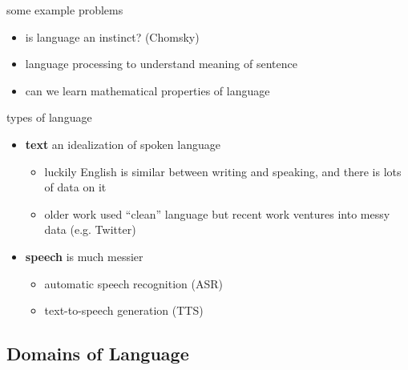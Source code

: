 \documentclass[]{article}
\theoremstyle{definition}
\begin{document}
    some example problems
    \begin{itemize}
        \item is language an instinct? (Chomsky)
        \item language processing to understand meaning of sentence
        \item can we learn mathematical properties of language
    \end{itemize}

    types of language
    \begin{itemize}
        \item \textbf{text} an idealization of spoken language
            \begin{itemize}
                \item luckily English is similar between writing and speaking, and there is lots of data on it
                \item older work used ``clean'' language but recent work ventures into messy data (e.g. Twitter)
            \end{itemize}
        \item \textbf{speech} is much messier
            \begin{itemize}
                \item automatic speech recognition (ASR)
                \item text-to-speech generation (TTS)
            \end{itemize}
    \end{itemize}

    \subsection{Domains of Language}%
    \label{sub:domains_of_language}
\end{document}

